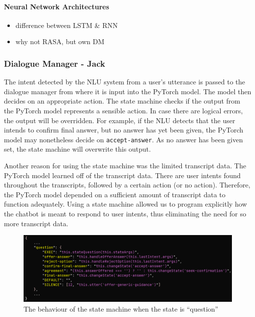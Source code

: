\documentclass[hidelinks, 11pt]{article}
\begin{document}
\paragraph{Neural Network Architectures}
\label{par:nn_architectures}

\begin{itemize}
  \item difference between LSTM \& RNN
  \item why not RASA, but own DM
\end{itemize}

\subsubsection{Dialogue Manager - Jack}
\label{subsec:dm}

The intent detected by the NLU system from a user's utterance is passed to the dialogue manager from where it is input into the PyTorch model. The model then decides on an appropriate action. The state machine checks if the output from the PyTorch model represents a sensible action. In case there are logical errors, the output will be overridden. For example, if the NLU detects that the user intends to confirm final answer, but no answer has yet been given, the PyTorch model may nonetheless decide on \verb|accept-answer|. As no answer has been given set, the state machine will overwrite this output.

Another reason for using the state machine was the limited transcript data. The PyTorch model learned off of the transcript data. There are user intents found throughout the transcripts, followed by a certain action (or no action). Therefore, the PyTorch model depended on a sufficient amount of transcript data to function adequately. Using a state machine allowed us to program explicitly how the chatbot is meant to respond to user intents, thus eliminating the need for so more transcript data.

\begin{figure}
  \includegraphics[width=\columnwidth]{images/jacks_figure.png}
  \caption{The behaviour of the state machine when the state is ``question''}
  \label{fig:jacks_figure}
\end{figure}
\end{document}
